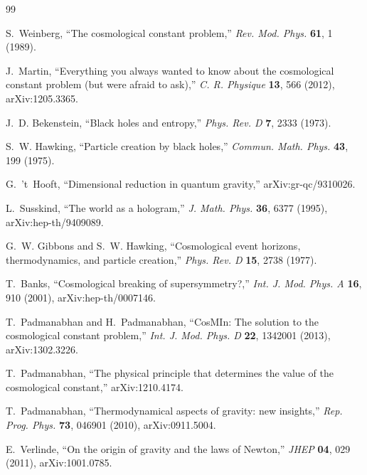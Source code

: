 \documentclass[11pt,a4paper]{article}
\begin{document}
\begin{thebibliography}{99}
\small

S.~Weinberg, ``The cosmological constant problem,''
\emph{Rev. Mod. Phys.} \textbf{61}, 1 (1989).

J.~Martin, ``Everything you always wanted to know about the cosmological
constant problem (but were afraid to ask),''
\emph{C. R. Physique} \textbf{13}, 566 (2012), arXiv:1205.3365.

J.~D. Bekenstein, ``Black holes and entropy,''
\emph{Phys. Rev. D} \textbf{7}, 2333 (1973).

S.~W. Hawking, ``Particle creation by black holes,''
\emph{Commun. Math. Phys.} \textbf{43}, 199 (1975).

G.~'t~Hooft, ``Dimensional reduction in quantum gravity,''
arXiv:gr-qc/9310026.

L.~Susskind, ``The world as a hologram,''
\emph{J. Math. Phys.} \textbf{36}, 6377 (1995), arXiv:hep-th/9409089.

G.~W. Gibbons and S.~W. Hawking, ``Cosmological event horizons,
thermodynamics, and particle creation,''
\emph{Phys. Rev. D} \textbf{15}, 2738 (1977).

T.~Banks, ``Cosmological breaking of supersymmetry?,''
\emph{Int. J. Mod. Phys. A} \textbf{16}, 910 (2001), arXiv:hep-th/0007146.

T.~Padmanabhan and H.~Padmanabhan, ``CosMIn: The solution to the
cosmological constant problem,''
\emph{Int. J. Mod. Phys. D} \textbf{22}, 1342001 (2013), arXiv:1302.3226.

T.~Padmanabhan, ``The physical principle that determines the value of the
cosmological constant,'' arXiv:1210.4174.

T.~Padmanabhan, ``Thermodynamical aspects of gravity: new insights,''
\emph{Rep. Prog. Phys.} \textbf{73}, 046901 (2010), arXiv:0911.5004.

E.~Verlinde, ``On the origin of gravity and the laws of Newton,''
\emph{JHEP} \textbf{04}, 029 (2011), arXiv:1001.0785.


\end{thebibliography}
\end{document}
